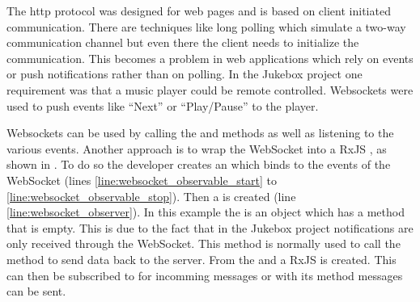 


The \gls{http} protocol was designed for web pages and is based on client initiated communication. There are techniques like long polling which simulate a two-way communication channel but even there the client needs to initialize the communication. This becomes a problem in web applications which rely on events or push notifications rather than on polling. In the Jukebox project one requirement was that a music player could be remote controlled. Websockets were used to push events like \enquote{Next} or \enquote{Play/Pause} to the player.


Websockets can be used by calling the  and  methods as well as listening to the various events. Another approach is to wrap the WebSocket into a RxJS , as shown in  \cite{rxjs} \cite{js_websockets}. To do so the developer creates an  which binds to the events of the WebSocket (lines \ref{line:websocket_observable_start} to \ref{line:websocket_observable_stop}). Then a  is created (line \ref{line:websocket_observer}). In this example the  is an object which has a  method that is empty. This is due to the fact that in the Jukebox project notifications are only received through the WebSocket. This  method is normally used to call the  method to send data back to the server. From the  and  a RxJS  is created. This  can then be subscribed to for incomming messages or with its  method messages can be sent.
